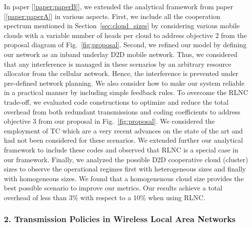 In paper {[\ref{paper:paperB}]}, we extended the analytical framework from paper {[\ref{paper:paperA}]} in various aspects. First, we include all the cooperation spectrum mentioned in Section~\ref{sec:cloud_sizes} by considering various mobile clouds with a variable number of heads per cloud to address objective 2 from the proposal diagram of Fig.~\ref{fig:proposal}. Second, we refined our model by defining our network as an inband underlay \ac{D2D} mobile network. Thus, we considered that any interference is managed in these scenarios by an arbitrary resource allocator from the cellular network. Hence, the interference is prevented under pre-defined network planning. We also consider how to make our system reliable in a practical manner by including simple feedback rules. To overcome the \ac{RLNC} trade-off, we evaluated code constructions to optimize and reduce the total overhead from both redundant transmissions and coding coefficients to address objective 3 from our proposal in Fig.~\ref{fig:proposal}. We considered the employment of \ac{TC} \cite{heidelucani2015composite} which are a very recent advances on the state of the art and had not been considered for these scenarios. We extended further our analytical framework to include these codes and observed that \ac{RLNC} is a special case in our framework. Finally, we analyzed the possible \ac{D2D} cooperative cloud (cluster) sizes to observe the operational regimes first with heterogeneous sizes and finally with homogeneous sizes. We found that a homogenenous cloud size provides the best possible scenario to improve our metrics. Our results achieve a total overhead of less than 3\% with respect to a 10\% when using \ac{RLNC}.

\subsubsection{2. Transmission Policies in Wireless Local Area Networks}


